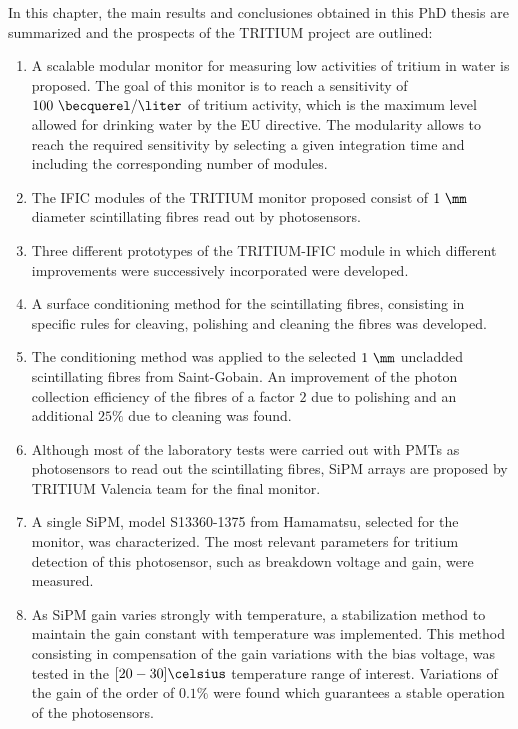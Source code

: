 In this chapter, the main results and conclusiones obtained in this PhD thesis are summarized and the prospects of the TRITIUM project are outlined:

\begin{enumerate}
\item{} A scalable modular monitor for measuring low activities of tritium in water is proposed. The goal of this monitor is to reach a sensitivity of $100~\becquerel/\liter$ of tritium activity, which is the maximum level allowed for drinking water by the EU directive. The modularity allows to reach the required sensitivity by selecting a given integration time and including the corresponding number of modules.

\item{} The IFIC modules of the TRITIUM monitor proposed consist of $1~\mm$ diameter scintillating fibres read out by photosensors.

\item{} Three different prototypes of the TRITIUM-IFIC module in which different improvements were successively incorporated were developed.

\item{} A surface conditioning method for the scintillating fibres, consisting in specific rules for cleaving, polishing and cleaning the fibres was developed.

\item{} The conditioning method was applied to the selected $1~\mm$ uncladded scintillating fibres from Saint-Gobain. An improvement of the photon collection efficiency of the fibres of a factor $2$ due to polishing and an additional $25\%$ due to cleaning was found.

\item{} Although most of the laboratory tests were carried out with PMTs as photosensors to read out the scintillating fibres, SiPM arrays are proposed by TRITIUM Valencia team for the final monitor. 

\item{} A single SiPM, model S13360-1375 from Hamamatsu, selected for the monitor, was characterized. The most relevant parameters for tritium detection of this photosensor, such as breakdown voltage and gain, were measured.

\item{} As SiPM gain varies strongly with temperature, a stabilization method to maintain the gain constant with temperature was implemented. This method consisting in compensation of the gain variations with the bias voltage, was tested in the $[20-30]\celsius$ temperature range of interest. Variations of the gain of the order of $0.1\%$ were found which guarantees a stable operation of the photosensors.


\end{enumerate}
